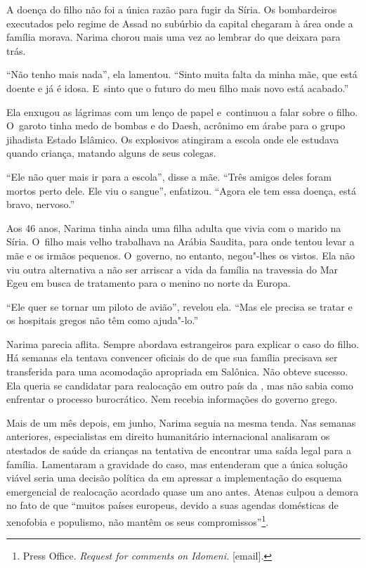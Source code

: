 A doença do filho não foi a única razão para fugir da Síria. Os
bombardeiros executados pelo regime de Assad no subúrbio da capital
chegaram à área onde a família morava. Narima chorou mais uma vez ao
lembrar do que deixara para trás.

``Não tenho mais nada'', ela lamentou. ``Sinto muita falta da minha mãe,
que está doente e já é idosa. E~sinto que o futuro do meu filho mais
novo está acabado.''

Ela enxugou as lágrimas com um lenço de papel e~continuou a falar sobre
o filho. O~garoto tinha medo de bombas e do Daesh, acrônimo em árabe
para o grupo jihadista Estado Islâmico. Os explosivos atingiram a escola
onde ele estudava quando criança, matando alguns de seus colegas.

``Ele não quer mais ir para a escola'', disse a mãe. ``Três amigos deles
foram mortos perto dele. Ele viu o sangue'', enfatizou. ``Agora ele tem
essa doença, está bravo, nervoso.''

Aos 46 anos, Narima tinha ainda uma filha adulta que vivia com o marido na
Síria. O~filho mais velho trabalhava na Arábia Saudita, para onde tentou
levar a mãe e os irmãos pequenos. O~governo, no entanto, negou"-lhes os
vistos. Ela não viu outra alternativa a não ser arriscar a vida da
família na travessia do Mar Egeu em busca de tratamento para o menino no
norte da Europa.

``Ele quer se tornar um piloto de avião'', revelou ela. ``Mas ele
precisa se tratar e os hospitais gregos não têm como ajuda"-lo.''

Narima parecia aflita. Sempre abordava estrangeiros para explicar o caso
do filho. Há semanas ela tentava convencer oficiais do  de que sua
família precisava ser transferida para uma acomodação apropriada em
Salônica. Não obteve sucesso. Ela queria se candidatar para realocação
em outro país da , mas não sabia como enfrentar o processo
burocrático. Nem recebia informações do governo grego.

Mais de um mês depois, em junho, Narima seguia na mesma tenda. Nas
semanas anteriores, especialistas em direito humanitário internacional
analisaram os atestados de saúde da crianças na tentativa de encontrar
uma saída legal para a família. Lamentaram a gravidade do caso, mas
entenderam que a única solução viável seria uma decisão política da 
em apressar a implementação do esquema emergencial de realocação
acordado quase um ano antes. Atenas culpou a demora no fato de que
``muitos países europeus, devido a suas agendas domésticas de xenofobia
e populismo, não mantêm os seus compromissos''\footnote{ Press Office. \emph{Request for comments on
Idomeni}\emph{.} {[}email{]}.}.

